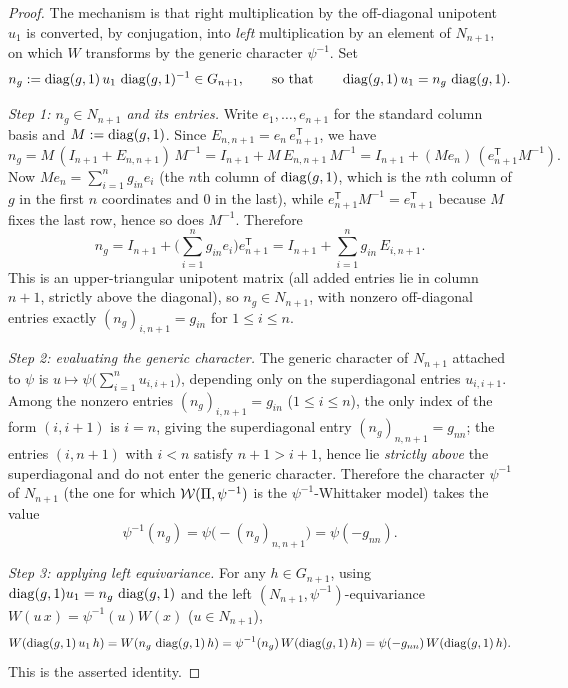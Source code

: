\begin{proof}
The mechanism is that right multiplication by the off-diagonal unipotent $u_1$ is converted, by
conjugation, into \emph{left} multiplication by an element of $N_{n+1}$, on which $W$ transforms by
the generic character $\psi^{-1}$. Set
\[
n_g:=\operatorname{diag}(g,1)\,u_1\,\operatorname{diag}(g,1)^{-1}\in G_{n+1},
\qquad\text{so that}\qquad \operatorname{diag}(g,1)\,u_1=n_g\,\operatorname{diag}(g,1).
\]

\emph{Step 1: $n_g\in N_{n+1}$ and its entries.}
Write $e_1,\dots,e_{n+1}$ for the standard column basis and $M:=\operatorname{diag}(g,1)$. Since
$E_{n,n+1}=e_n\,e_{n+1}^{\mathsf T}$, we have
\[
n_g=M\,(I_{n+1}+E_{n,n+1})\,M^{-1}=I_{n+1}+M\,E_{n,n+1}\,M^{-1}
=I_{n+1}+(M e_n)\,(e_{n+1}^{\mathsf T}M^{-1}).
\]
Now $M e_n=\sum_{i=1}^{n}g_{in}e_i$ \textup{(}the $n$th column of $\operatorname{diag}(g,1)$, which is the
$n$th column of $g$ in the first $n$ coordinates and $0$ in the last\textup{)}, while
$e_{n+1}^{\mathsf T}M^{-1}=e_{n+1}^{\mathsf T}$ because $M$ fixes the last row, hence so does $M^{-1}$.
Therefore
\[
n_g=I_{n+1}+\Big(\sum_{i=1}^n g_{in}e_i\Big)e_{n+1}^{\mathsf T}
=I_{n+1}+\sum_{i=1}^{n}g_{in}\,E_{i,n+1}.
\]
This is an upper-triangular unipotent matrix \textup{(}all added entries lie in column $n+1$,
strictly above the diagonal\textup{)}, so $n_g\in N_{n+1}$, with nonzero off-diagonal entries
exactly $(n_g)_{i,n+1}=g_{in}$ for $1\le i\le n$.

\emph{Step 2: evaluating the generic character.}
The generic character of $N_{n+1}$ attached to $\psi$ is
$u\mapsto\psi\big(\sum_{i=1}^{n}u_{i,i+1}\big)$, depending only on the superdiagonal entries
$u_{i,i+1}$. Among the nonzero entries $(n_g)_{i,n+1}=g_{in}$ \textup{(}$1\le i\le n$\textup{)},
the only index of the form $(i,i+1)$ is $i=n$, giving the superdiagonal entry $(n_g)_{n,n+1}=g_{nn}$;
the entries $(i,n+1)$ with $i<n$ satisfy $n+1>i+1$, hence lie \emph{strictly above} the
superdiagonal and do not enter the generic character. Therefore the character $\psi^{-1}$ of
$N_{n+1}$ \textup{(}the one for which $\mathcal{W}(\Pi,\psi^{-1})$ is the $\psi^{-1}$-Whittaker
model\textup{)} takes the value
\[
\psi^{-1}(n_g)=\psi\!\big(-(n_g)_{n,n+1}\big)=\psi(-g_{nn}).
\]

\emph{Step 3: applying left equivariance.}
For any $h\in G_{n+1}$, using $\operatorname{diag}(g,1)u_1=n_g\,\operatorname{diag}(g,1)$ and the left
$(N_{n+1},\psi^{-1})$-equivariance $W(u\,x)=\psi^{-1}(u)W(x)$ \textup{(}$u\in N_{n+1}$\textup{)},
\[
W(\operatorname{diag}(g,1)\,u_1\,h)=W(n_g\,\operatorname{diag}(g,1)\,h)
=\psi^{-1}(n_g)\,W(\operatorname{diag}(g,1)\,h)=\psi(-g_{nn})\,W(\operatorname{diag}(g,1)\,h).
\]
This is the asserted identity.


\end{proof}
